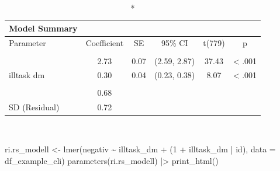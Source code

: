 \documentclass[
  letterpaper,
  DIV=11,
  numbers=noendperiod]{scrreprt}
\newenvironment{Shaded}{\begin{snugshade}}{\end{snugshade}}
\newcommand{\AttributeTok}[1]{\textcolor[rgb]{0.40,0.45,0.13}{#1}}
\newcommand{\DecValTok}[1]{\textcolor[rgb]{0.68,0.00,0.00}{#1}}
\newcommand{\FunctionTok}[1]{\textcolor[rgb]{0.28,0.35,0.67}{#1}}
\newcommand{\NormalTok}[1]{\textcolor[rgb]{0.00,0.23,0.31}{#1}}
\newcommand{\OtherTok}[1]{\textcolor[rgb]{0.00,0.23,0.31}{#1}}
\newcommand{\SpecialCharTok}[1]{\textcolor[rgb]{0.37,0.37,0.37}{#1}}
\begin{document}
\begin{tcolorbox}
\begingroup
\fontsize{12.0pt}{14.4pt}\selectfont
\setlength{\LTpost}{0mm}
\begin{longtable*}{lccccc}
\caption*{
{\large Model Summary}
} \\ 
\toprule
Parameter & Coefficient & SE & 95\% CI & t(779) & p \\ 
\midrule\addlinespace[2.5pt]
 \\[2.5pt] 
\midrule{} & 2.73 & 0.07 & (2.59, 2.87) & 37.43 & < .001 \\ 
{illtask dm} & 0.30 & 0.04 & (0.23, 0.38) & 8.07 & < .001 \\ 
\midrule\addlinespace[2.5pt]
 \\[2.5pt] 
\midrule{} & 0.68 &  &  &  &  \\ 
{SD (Residual)} & 0.72 &  &  &  &  \\ 
\bottomrule
\end{longtable*}
\begin{minipage}{\linewidth}
\\
\end{minipage}
\endgroup

\begin{Shaded}
\begin{Highlighting}[]
\NormalTok{ri.rs\_modell }\OtherTok{\textless{}{-}} \FunctionTok{lmer}\NormalTok{(negativ }\SpecialCharTok{\textasciitilde{}}\NormalTok{ illtask\_dm }\SpecialCharTok{+}\NormalTok{ (}\DecValTok{1} \SpecialCharTok{+}\NormalTok{ illtask\_dm }\SpecialCharTok{|}\NormalTok{ id), }\AttributeTok{data =}\NormalTok{ df\_example\_cli)}
\FunctionTok{parameters}\NormalTok{(ri.rs\_modell) }\SpecialCharTok{|\textgreater{}} \FunctionTok{print\_html}\NormalTok{()}
\end{Highlighting}
\end{Shaded}


\end{tcolorbox}
\end{document}
